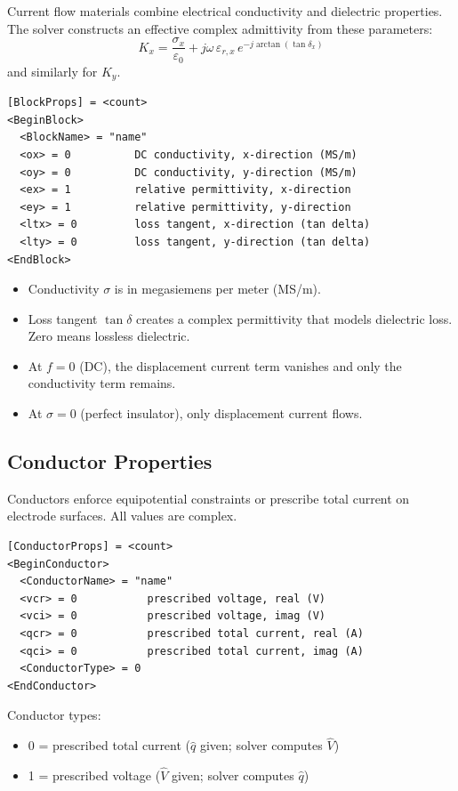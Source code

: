 \documentclass[11pt]{article}
\begin{document}
Current flow materials combine electrical conductivity and dielectric
properties.  The solver constructs an effective complex admittivity
from these parameters:
\[
  K_x = \frac{\sigma_x}{\varepsilon_0} + j\omega\,\varepsilon_{r,x}
        \, e^{-j\arctan(\tan\delta_x)}
\]
and similarly for $K_y$.

\begin{lstlisting}
[BlockProps] = <count>
<BeginBlock>
  <BlockName> = "name"
  <ox> = 0          DC conductivity, x-direction (MS/m)
  <oy> = 0          DC conductivity, y-direction (MS/m)
  <ex> = 1          relative permittivity, x-direction
  <ey> = 1          relative permittivity, y-direction
  <ltx> = 0         loss tangent, x-direction (tan delta)
  <lty> = 0         loss tangent, y-direction (tan delta)
<EndBlock>
\end{lstlisting}

\begin{itemize}[nosep]
  \item Conductivity $\sigma$ is in megasiemens per meter (MS/m).
  \item Loss tangent $\tan\delta$ creates a complex permittivity that
        models dielectric loss.  Zero means lossless dielectric.
  \item At $f = 0$ (DC), the displacement current term vanishes and
        only the conductivity term remains.
  \item At $\sigma = 0$ (perfect insulator), only displacement current
        flows.
\end{itemize}

\subsection{Conductor Properties}

Conductors enforce equipotential constraints or prescribe total
current on electrode surfaces.  All values are complex.

\begin{lstlisting}
[ConductorProps] = <count>
<BeginConductor>
  <ConductorName> = "name"
  <vcr> = 0           prescribed voltage, real (V)
  <vci> = 0           prescribed voltage, imag (V)
  <qcr> = 0           prescribed total current, real (A)
  <qci> = 0           prescribed total current, imag (A)
  <ConductorType> = 0
<EndConductor>
\end{lstlisting}

Conductor types:
\begin{itemize}[nosep]
  \item 0 = prescribed total current ($\hat{q}$ given; solver
        computes $\hat{V}$)
  \item 1 = prescribed voltage ($\hat{V}$ given; solver computes
        $\hat{q}$)
\end{itemize}
\end{document}

